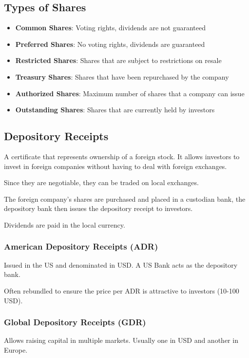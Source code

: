 \subsection{Types of Shares}
\begin{itemize}
    \item \textbf{Common Shares}: Voting rights, dividends are not guaranteed
    \item \textbf{Preferred Shares}: No voting rights, dividends are guaranteed
    \item \textbf{Restricted Shares}: Shares that are subject to restrictions on resale
    \item \textbf{Treasury Shares}: Shares that have been repurchased by the company
    \item \textbf{Authorized Shares}: Maximum number of shares that a company can issue
    \item \textbf{Outstanding Shares}: Shares that are currently held by investors
\end{itemize}

\subsection{Depository Receipts}
A certificate that represents ownership of a foreign stock. It allows investors to invest in foreign companies without having to deal with foreign exchanges.

Since they are negotiable, they can be traded on local exchanges.

The foreign company's shares are purchased and placed in a custodian bank, the depository bank then issues the depository receipt to investors.

Dividends are paid in the local currency.

\subsubsection{American Depository Receipts (ADR)}
Issued in the US and denominated in USD.
A US Bank acts as the depository bank.

Often rebundled to ensure the price per ADR is attractive to investors (10-100 USD).

\subsubsection{Global Depository Receipts (GDR)}
Allows raising capital in multiple markets.
Usually one in USD and another in Europe.

